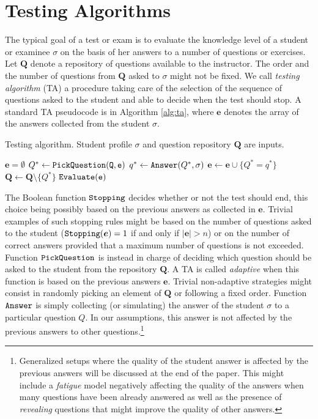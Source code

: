 \documentclass[runningheads]{llncs}
\begin{document}
\section{Testing Algorithms}
The typical goal of a test or exam is to evaluate the knowledge level of a student or examinee $\sigma$ on the basis of her answers to a number of questions or exercises. Let $\bm{Q}$ denote a repository of questions available to the instructor. The order and the number of questions from $\bm{Q}$ asked to $\sigma$ might not be fixed. We call \emph{testing algorithm} (TA) a procedure taking care of the selection of the sequence of questions asked to the student and able to decide when the test should stop. A standard TA pseudocode is in Algorithm \ref{alg:ta}, where $\bm{e}$ denotes the array of the answers collected from the student $\sigma$.

\begin{algorithm}[htbp!]
    \caption{Testing algorithm. Student profile $\sigma$ and question repository $\bm{Q}$ are inputs.}
    \begin{algorithmic}[1]
    \STATE $\bm{e}=\emptyset$
        \STATE $Q^* \gets \tt{PickQuestion}(\bm{Q},\bm{e})$
        \STATE $q^* \gets {\tt{Answer}}(Q^*,\sigma)$
        \STATE $\bm{e} \gets \bm{e} \cup \{ Q^*=q^* \}$
        \STATE $\bm{Q} \gets \bm{Q} \setminus \{ Q^*\}$
        \ENDWHILE
         $\tt{Evaluate}(\bm{e})$
    \end{algorithmic}\label{alg:ta}
\end{algorithm}

The Boolean function ${\tt Stopping}$ decides whether or not the test should end, this choice being possibly based on the previous answers as collected in $\bm{e}$. Trivial examples of such stopping rules might be based on the number of questions asked to the student (${\tt Stopping}(\bm{e})=1$ if and only if $|\bm{e}|>n$) or on the number of correct answers provided that a maximum number of questions is not exceeded. Function ${\tt PickQuestion}$ is instead in charge of deciding which question should be asked to the student from the repository $\bm{Q}$. A TA is called \emph{adaptive} when this function is based on the previous answers $\bm{e}$. Trivial non-adaptive strategies might consist in randomly picking an element of $\bm{Q}$ or following a fixed order. Function ${\tt Answer}$ is simply collecting (or simulating) the answer of the student $\sigma$ to a particular question $Q$. In our assumptions, this answer is not affected by the previous answers to other questions.\footnote{Generalized setups where the quality of the student answer is affected by the previous answers will be discussed at the end of the paper. This might include a \emph{fatigue} model negatively affecting the quality of the answers when many questions have been already answered as well as the presence of \emph{revealing} questions that might improve the quality of other answers.} 
\end{document}
